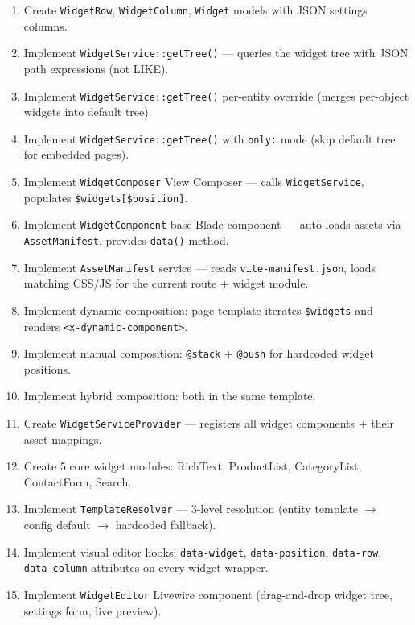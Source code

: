 \documentclass[11pt,a4paper]{article}
\begin{document}
\begin{enumerate}[leftmargin=1.6em,itemsep=2pt]
  \item Create \texttt{WidgetRow}, \texttt{WidgetColumn},
        \texttt{Widget} models with JSON settings columns.
  \item Implement \texttt{WidgetService::getTree()} --- queries the
        widget tree with JSON path expressions (not LIKE).
  \item Implement \texttt{WidgetService::getTree()} per-entity override
        (merges per-object widgets into default tree).
  \item Implement \texttt{WidgetService::getTree()} with
        \texttt{only:} mode (skip default tree for embedded pages).
  \item Implement \texttt{WidgetComposer} View Composer --- calls
        \texttt{WidgetService}, populates \texttt{\$widgets[\$position]}.
  \item Implement \texttt{WidgetComponent} base Blade component ---
        auto-loads assets via \texttt{AssetManifest}, provides
        \texttt{data()} method.
  \item Implement \texttt{AssetManifest} service --- reads
        \texttt{vite-manifest.json}, loads matching CSS/JS for the
        current route + widget module.
  \item Implement dynamic composition: page template iterates
        \texttt{\$widgets} and renders \texttt{<x-dynamic-component>}.
  \item Implement manual composition: \texttt{@stack} + \texttt{@push}
        for hardcoded widget positions.
  \item Implement hybrid composition: both in the same template.
  \item Create \texttt{WidgetServiceProvider} --- registers all widget
        components + their asset mappings.
  \item Create 5 core widget modules: RichText, ProductList,
        CategoryList, ContactForm, Search.
  \item Implement \texttt{TemplateResolver} --- 3-level resolution
        (entity template $\to$ config default $\to$ hardcoded fallback).
  \item Implement visual editor hooks: \texttt{data-widget},
        \texttt{data-position}, \texttt{data-row}, \texttt{data-column}
        attributes on every widget wrapper.
  \item Implement \texttt{WidgetEditor} Livewire component (drag-and-drop
        widget tree, settings form, live preview).
\end{enumerate}
\end{document}
